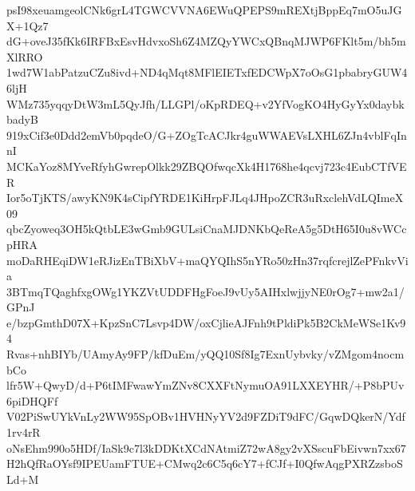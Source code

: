 psI98xeuamgeolCNk6grL4TGWCVVNA6EWuQPEPS9mREXtjBppEq7mO5uJGX+1Qz7
dG+oveJ35fKk6IRFBxEsvHdvxoSh6Z4MZQyYWCxQBnqMJWP6FKlt5m/bh5mXlRRO
1wd7W1abPatzuCZu8ivd+ND4qMqt8MFlEIETxfEDCWpX7oOsG1pbabryGUW46ljH
WMz735yqqyDtW3mL5QyJfh/LLGPl/oKpRDEQ+v2YfVogKO4HyGyYx0daybkbadyB
919xCif3e0Ddd2emVb0pqdeO/G+ZOgTcACJkr4guWWAEVsLXHL6ZJn4vblFqInnI
MCKaYoz8MYveRfyhGwrepOlkk29ZBQOfwqcXk4H1768he4qcvj723c4EubCTfVER
Ior5oTjKTS/awyKN9K4sCipfYRDE1KiHrpFJLq4JHpoZCR3uRxclehVdLQImeX09
qbcZyoweq3OH5kQtbLE3wGmb9GULsiCnaMJDNKbQeReA5g5DtH65I0u8vWCcpHRA
moDaRHEqiDW1eRJizEnTBiXbV+maQYQIhS5nYRo50zHn37rqfcrejlZePFnkvVia
3BTmqTQaghfxgOWg1YKZVtUDDFHgFoeJ9vUy5AIHxlwjjyNE0rOg7+mw2a1/GPnJ
e/bzpGmthD07X+KpzSnC7Lsvp4DW/oxCjlieAJFnh9tPldiPk5B2CkMeWSe1Kv94
Rvas+nhBIYb/UAmyAy9FP/kfDuEm/yQQ10Sf8Ig7ExnUybvky/vZMgom4nocmbCo
lfr5W+QwyD/d+P6tIMFwawYmZNv8CXXFtNymuOA91LXXEYHR/+P8bPUv6piDHQFf
V02PiSwUYkVnLy2WW95SpOBv1HVHNyYV2d9FZDiT9dFC/GqwDQkerN/Ydf1rv4rR
oNsEhm990o5HDf/IaSk9c7l3kDDKtXCdNAtmiZ72wA8gy2vXSscuFbEivwn7xx67
H2hQfRaOYsf9IPEUamFTUE+CMwq2c6C5q6cY7+fCJf+I0QfwAqgPXRZzsboSLd+M
